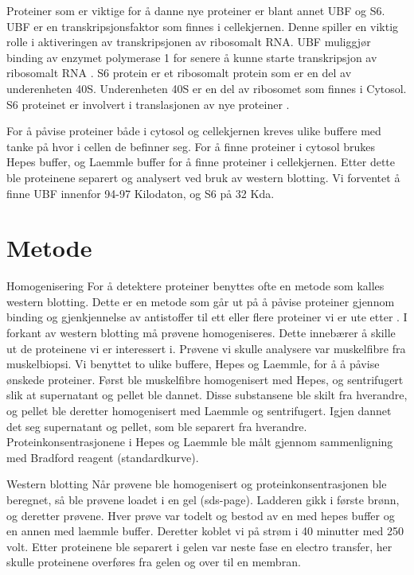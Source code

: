 \documentclass[
]{book}
\begin{document}
Proteiner som er viktige for å danne nye proteiner er blant annet UBF og S6. UBF er en transkripsjonsfaktor som finnes i cellekjernen. Denne spiller en viktig rolle i aktiveringen av transkripsjonen av ribosomalt RNA. UBF muliggjør binding av enzymet polymerase 1 for senere å kunne starte transkripsjon av ribosomalt RNA \citep{copenhaver1994}. S6 protein er et ribosomalt protein som er en del av underenheten 40S. Underenheten 40S er en del av ribosomet som finnes i Cytosol. S6 proteinet er involvert i translasjonen av nye proteiner \citep{puighermanal2017}.

For å påvise proteiner både i cytosol og cellekjernen kreves ulike buffere med tanke på hvor i cellen de befinner seg. For å finne proteiner i cytosol brukes Hepes buffer, og Laemmle buffer for å finne proteiner i cellekjernen. Etter dette ble proteinene separert og analysert ved bruk av western blotting. Vi forventet å finne UBF innenfor 94-97 Kilodaton, og S6 på 32 Kda.

\hypertarget{metode}{%
\section{Metode}\label{metode}}

Homogenisering For å detektere proteiner benyttes ofte en metode som kalles western blotting. Dette er en metode som går ut på å påvise proteiner gjennom binding og gjenkjennelse av antistoffer til ett eller flere proteiner vi er ute etter \citep{bass2017}. I forkant av western blotting må prøvene homogeniseres. Dette innebærer å skille ut de proteinene vi er interessert i. Prøvene vi skulle analysere var muskelfibre fra muskelbiopsi. Vi benyttet to ulike buffere, Hepes og Laemmle, for å å påvise ønskede proteiner. Først ble muskelfibre homogenisert med Hepes, og sentrifugert slik at supernatant og pellet ble dannet. Disse substansene ble skilt fra hverandre, og pellet ble deretter homogenisert med Laemmle og sentrifugert. Igjen dannet det seg supernatant og pellet, som ble separert fra hverandre. Proteinkonsentrasjonene i Hepes og Laemmle ble målt gjennom sammenligning med Bradford reagent (standardkurve).

Western blotting Når prøvene ble homogenisert og proteinkonsentrasjonen ble beregnet, så ble prøvene loadet i en gel (sds-page). Ladderen gikk i første brønn, og deretter prøvene. Hver prøve var todelt og bestod av en med hepes buffer og en annen med laemmle buffer. Deretter koblet vi på strøm i 40 minutter med 250 volt. Etter proteinene ble separert i gelen var neste fase en electro transfer, her skulle proteinene overføres fra gelen og over til en membran.
\end{document}
